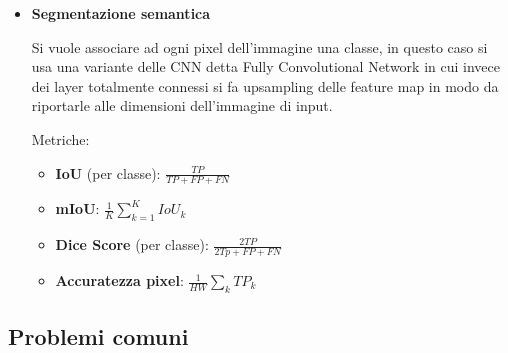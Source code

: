 \documentclass{article}
\begin{document}
\begin{itemize}
    \item \textbf{Segmentazione semantica}

        Si vuole associare ad ogni pixel dell'immagine una classe, in questo caso si usa una variante delle CNN detta Fully Convolutional Network in cui invece dei layer totalmente connessi si fa upsampling delle feature map in modo da riportarle alle dimensioni dell'immagine di input.

        Metriche:
        \begin{itemize}
            \item \textbf{IoU} (per classe): $\frac{TP}{TP+FP+FN}$
            \item \textbf{mIoU}: $\frac1K\sum_{k=1}^KIoU_k$
            \item \textbf{Dice Score} (per classe): $\frac{2TP}{2Tp+FP+FN}$
            \item \textbf{Accuratezza pixel}: $\frac1{HW}\sum_kTP_k$
        \end{itemize}
    
\end{itemize}

\subsection{Problemi comuni}
\end{document}
